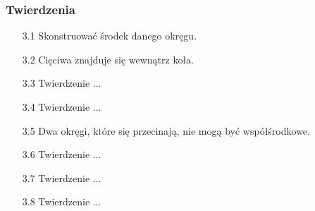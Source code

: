 \subsubsection{Twierdzenia}
\begin{enumerate}
    \item [3.1] Skonstruować środek danego okręgu. 
    \item [3.2] Cięciwa znajduje się wewnątrz koła.
    \item [3.3] Twierdzenie ...
    \item [3.4] Twierdzenie ...
    \item [3.5] Dwa okręgi, które się przecinają, nie mogą być współśrodkowe. 
    \item [3.6] Twierdzenie ...
    \item [3.7] Twierdzenie ...
    \item [3.8] Twierdzenie ...

\end{enumerate}
